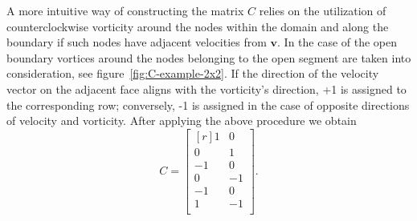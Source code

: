 \documentclass{article}
\begin{document}

A more intuitive way of constructing the matrix $C$ relies on the utilization of counterclockwise vorticity around the nodes within the domain and along the boundary if such nodes have adjacent velocities from $\boldsymbol{v}$. In the case of the open boundary vortices around the nodes belonging to the open segment are taken into consideration, see figure~\ref{fig:C-example-2x2}. If the direction of the velocity vector on the adjacent face aligns with the vorticity's direction, +1 is assigned to the corresponding row; conversely, -1 is assigned in the case of opposite directions of velocity and vorticity. After applying the above procedure we obtain
\begin{equation}
  C = 
  \begin{bmatrix*}[r]
  1		&	0\\
  0		&	1\\
  -1	&	0\\
  0		&	-1\\
  -1	&	0\\
  1		&	-1\\
\end{bmatrix*}.
\end{equation}
\end{document}
